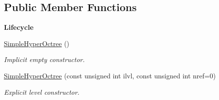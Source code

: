 \subsection*{Public Member Functions}
\begin{Indent}{\bf Lifecycle}\par
\begin{DoxyCompactItemize}
\item 
\hyperlink{exceptionmagrathea_1_1SimpleHyperOctree_a3a4bd118969993ef5ca6bfb0855e0253}{Simple\-Hyper\-Octree} ()
\begin{DoxyCompactList}\small\item\em Implicit empty constructor. \end{DoxyCompactList}\item 
\hyperlink{exceptionmagrathea_1_1SimpleHyperOctree_a860d5400937cb0aab76ff88d320eecfc}{Simple\-Hyper\-Octree} (const unsigned int ilvl, const unsigned int nref=0)
\begin{DoxyCompactList}\small\item\em Explicit level constructor. \end{DoxyCompactList}\end{DoxyCompactItemize}
\end{Indent}
